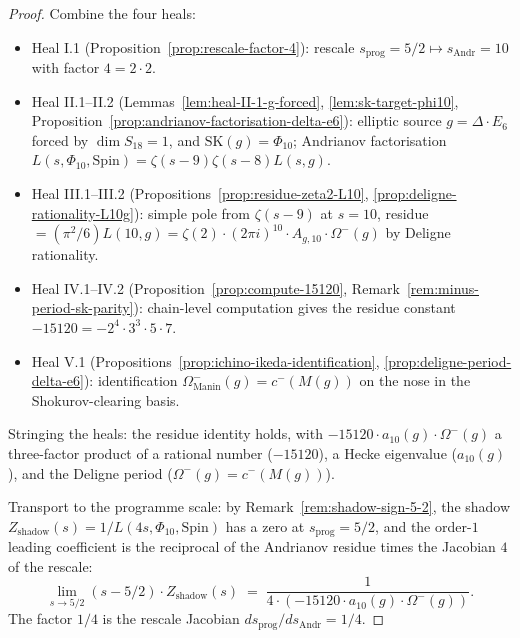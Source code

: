 \begin{proof}
Combine the four heals:
\begin{itemize}
\item Heal I.1 (Proposition~\ref{prop:rescale-factor-4}): rescale
  $s_{\mathrm{prog}} = 5/2 \mapsto s_{\mathrm{Andr}} = 10$ with factor
  $4 = 2 \cdot 2$.
\item Heal II.1--II.2 (Lemmas~\ref{lem:heal-II-1-g-forced},
  \ref{lem:sk-target-phi10}, Proposition~\ref{prop:andrianov-factorisation-delta-e6}):
  elliptic source $g = \Delta \cdot E_6$ forced by $\dim S_{18} = 1$,
  and $\mathrm{SK}(g) = \Phi_{10}$; Andrianov factorisation $L(s,
  \Phi_{10}, \mathrm{Spin}) = \zeta(s - 9) \zeta(s - 8) L(s, g)$.
\item Heal III.1--III.2 (Propositions~\ref{prop:residue-zeta2-L10},
  \ref{prop:deligne-rationality-L10g}): simple pole from $\zeta(s - 9)$
  at $s = 10$, residue $= (\pi^2/6) L(10, g) = \zeta(2) \cdot (2 \pi i)^{10}
  \cdot A_{g, 10} \cdot \Omega^-(g)$ by Deligne rationality.
\item Heal IV.1--IV.2 (Proposition~\ref{prop:compute-15120},
  Remark~\ref{rem:minus-period-sk-parity}): chain-level computation
  gives the residue constant $-15120 = -2^4 \cdot 3^3 \cdot 5 \cdot
  7$.
\item Heal V.1 (Propositions~\ref{prop:ichino-ikeda-identification},
  \ref{prop:deligne-period-delta-e6}): identification
  $\Omega^-_{\mathrm{Manin}}(g) = c^-(M(g))$ on the nose in the
  Shokurov-clearing basis.
\end{itemize}
Stringing the heals: the residue identity holds, with $-15120
\cdot a_{10}(g) \cdot \Omega^-(g)$ a three-factor product of a
rational number ($-15120$), a Hecke eigenvalue ($a_{10}(g)$), and
the Deligne period ($\Omega^-(g) = c^-(M(g))$).

Transport to the programme scale: by Remark~\ref{rem:shadow-sign-5-2},
the shadow $Z_{\mathrm{shadow}}(s) = 1 / L(4 s, \Phi_{10}, \mathrm{Spin})$
has a zero at $s_{\mathrm{prog}} = 5/2$, and the order-$1$ leading
coefficient is the reciprocal of the Andrianov residue times the
Jacobian $4$ of the rescale:
\[
 \lim_{s \to 5/2} (s - 5/2) \cdot Z_{\mathrm{shadow}}(s) \;=\; \frac{1}{4
 \cdot (-15120 \cdot a_{10}(g) \cdot \Omega^-(g))}.
\]
The factor $1/4$ is the rescale Jacobian $ds_{\mathrm{prog}} /
ds_{\mathrm{Andr}} = 1/4$.
\end{proof}


